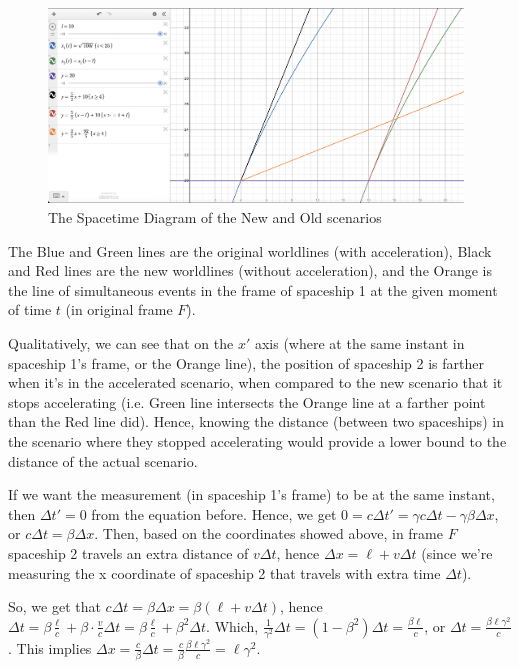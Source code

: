 \documentclass{article}
\begin{document}
\begin{figure}[h!]
    \begin{center}
        \includegraphics[width=110mm]{time2.png}
        \caption{The Spacetime Diagram of the New and Old scenarios}
    \end{center}
\end{figure}

The Blue and Green lines are the original worldlines (with acceleration), Black and Red lines are the new worldlines (without acceleration), and the Orange is the line of simultaneous events in the frame of spaceship 1 at the given moment of time $t$ (in original frame $F$).

Qualitatively, we can see that on the $x'$ axis (where at the same instant in spaceship 1's frame, or the Orange line), the position of spaceship 2 is farther when it's in the accelerated scenario, when compared to the new scenario that it stops accelerating (i.e. Green line intersects the Orange line at a farther point than the Red line did). Hence, knowing the distance (between two spaceships) in the scenario where they stopped accelerating would provide a lower bound to the distance of the actual scenario.

If we want the measurement (in spaceship 1's frame) to be at the same instant, then $\Delta t' = 0$ from the equation before. Hence, we get $0=c\Delta t' = \gamma c\Delta t-\gamma\beta\Delta x$, or $c\Delta t = \beta \Delta x$. Then, based on the coordinates showed above, in frame $F$ spaceship 2 travels an extra distance of $v\Delta t$, hence $\Delta x = \ell + v\Delta t$ (since we're measuring the x coordinate of spaceship 2 that travels with extra time $\Delta t$).

So, we get that $c \Delta t = \beta \Delta x = \beta(\ell + v\Delta t)$, hence $\Delta t = \beta\frac{\ell}{c} + \beta\cdot\frac{v}{c}\Delta t = \beta\frac{\ell}{c}+\beta^2\Delta t$. Which, $\frac{1}{\gamma^2}\Delta t = (1-\beta^2)\Delta t = \frac{\beta\ell}{c}$, or $\Delta t = \frac{\beta\ell\gamma^2}{c}$. This implies $\Delta x = \frac{c}{\beta}\Delta t = \frac{c}{\beta}\frac{\beta \ell\gamma^2}{c} = \ell\gamma^2$.
\end{document}
